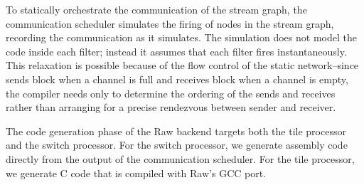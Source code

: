 To statically orchestrate the communication of the stream graph, the
communication scheduler simulates the firing of nodes in the stream
graph, recording the communication as it simulates.  The simulation
does not model the code inside each filter; instead it assumes that
each filter fires instantaneously.  This relaxation is possible
because of the flow control of the static network--since sends block
when a channel is full and receives block when a channel is empty, the
compiler needs only to determine the ordering of the sends and
receives rather than arranging for a precise rendezvous between sender
and receiver.

The code generation phase of the Raw backend targets both the tile
processor and the switch processor.  For the switch processor, we
generate assembly code directly from the output of the communication
scheduler.  For the tile processor, we generate C code that is
compiled with Raw's GCC port.


